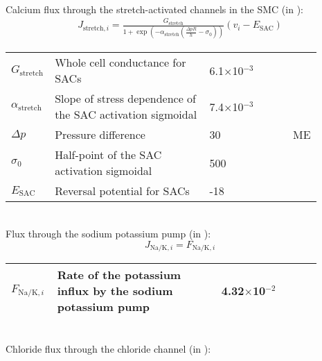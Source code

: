 \\
%
Calcium flux through the stretch-activated channels in the SMC (in \uMs): 
\begin{equation} \label{eq:Jstretchi}
\begin{split}
J_{\text{stretch},i}= \frac{G_{\text{stretch}}}{1+ \exp\left(-\alpha_{\text{stretch}}  \left(  \frac{\Delta pR}{h} -\sigma_{0}   \right) \right)}  \left(  v_{i}-E_{\text{SAC}}   \right) 
\end{split}
\end{equation}
%
\begin{table}[h!]
\centering
\begin{tabular}{ p{0.09\linewidth}  >{\footnotesize} p{0.5\linewidth}  >{\footnotesize} p{0.27\linewidth} >{\footnotesize} p{0.03\linewidth} }
\hline
$G_{\text{stretch}}$      		& Whole cell conductance for SACs						& 6.1$\times$10$^{-3}$ \uMpmVs	&\cite{Koenigsberger2006} \\
$\alpha_{\text{stretch}}$      & Slope of stress dependence of the SAC activation sigmoidal	& 7.4$\times$10$^{-3}$ \pmmHg	&\cite{Koenigsberger2006} \\
$ \Delta p $			& Pressure difference										& 30 \mmHg			& ME \\
$\sigma_{0}$      		& Half-point of the SAC activation sigmoidal				& 500 \mmHg			&\cite{Koenigsberger2006} \\
$E_{\text{SAC}}$      			& Reversal potential for SACs							& -18 \mV			&\cite{Koenigsberger2006} \\
\hline
\end{tabular}
\label{tab:Jstretchi}
\end{table}
\\
%
Flux through the sodium potassium pump (in \uMs): 
\begin{equation} \label{eq:J_NaK_i}
J_{\text{Na/K},i}= F_{\text{Na/K},i}
\end{equation}
%
\begin{table}[h!]
\centering
\begin{tabular}{ p{0.09\linewidth}  >{\footnotesize} p{0.5\linewidth}  >{\footnotesize} p{0.27\linewidth} >{\footnotesize} p{0.03\linewidth} }
\hline
$F_{\text{Na/K},i}$      			& Rate of the potassium influx by the sodium potassium pump 		& 4.32$\times$10$^{-2}$ \uMps 	&\cite{Koenigsberger2006} \\
\hline
\end{tabular}
\label{tab:JCli}
\end{table}
\\
Chloride flux through the chloride channel (in \uMs):

